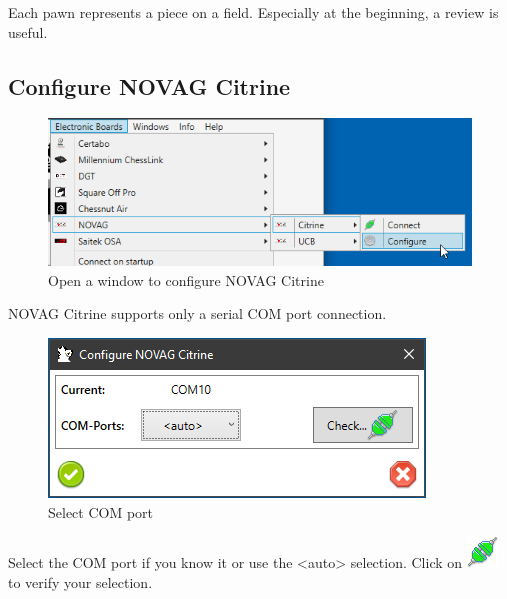 \documentclass[11pt,a4paper]{article}
\begin{document}
Each pawn represents a piece on a field. Especially at the beginning, a review is useful. 

\subsection{Configure NOVAG Citrine} \label{ConfigureNovagCitrine}

\begin{figure}[H]
	\centering
	\includegraphics[scale=0.8]{NovagCitrine1.png}
	\caption{Open a window to configure NOVAG Citrine }
	\label{fig:NovagCtrine1}
\end{figure}

NOVAG Citrine supports only a serial COM port connection.

\begin{figure}[H]
	\centering
	\includegraphics[scale=1.0]{NovagCitrine2.png}
	\caption{Select COM port}
	\label{fig:NovagCtrine2}
\end{figure}

Select the COM port if you know it or use the <auto> selection. 
Click on \includegraphics[scale=0.5]{connect.png} to verify your selection.
\end{document}
